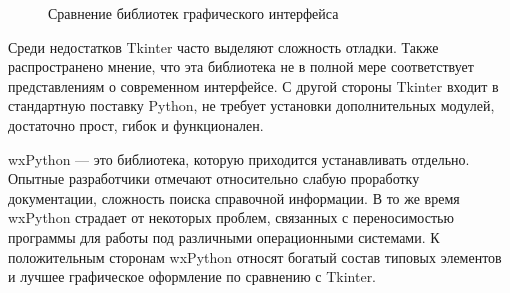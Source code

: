 \documentclass[12pt]{diploma}
\begin{document}
	\begin{figure}[h!] %
		\centering
		\begin{subfigmatrix}{2}
		\end{subfigmatrix}
		\caption{Сравнение библиотек графического интерфейса}
		\label{fig:gui-samples}
	\end{figure}
	
	Среди недостатков Tkinter часто выделяют сложность отладки. Также распространено мнение, что эта библиотека не в полной мере соответствует представлениям о современном интерфейсе. С другой стороны Tkinter входит в стандартную поставку Python, не требует установки дополнительных модулей, достаточно прост, гибок и функционален. 
	
	wxPython --- это библиотека, которую приходится устанавливать отдельно. Опытные разработчики отмечают относительно слабую проработку документации, сложность поиска справочной информации. В то же время wxPython страдает от некоторых проблем, связанных с переносимостью программы для работы под различными операционными системами. К положительным сторонам wxPython относят богатый состав типовых элементов и лучшее графическое оформление по сравнению с Tkinter. 
	
\end{document}
